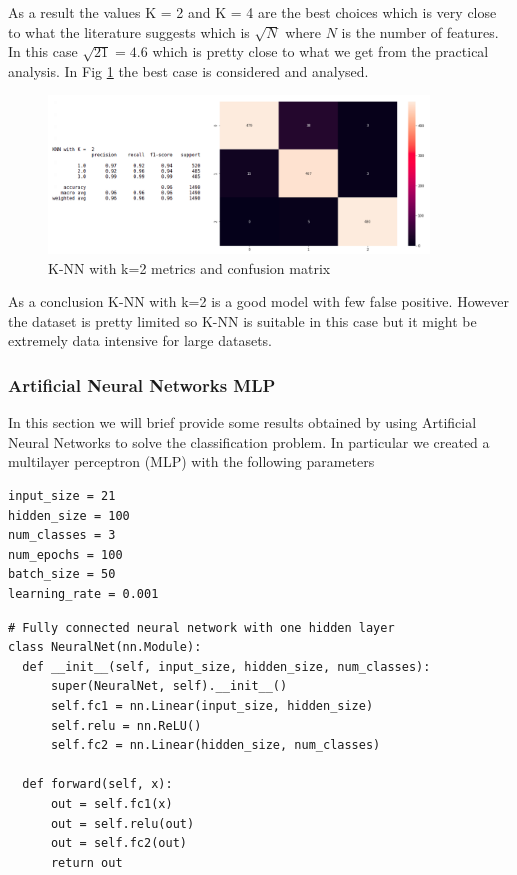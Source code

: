 \documentclass[a4paper,12pt]{article}
\begin{document}
\noindent As a result the values K = 2 and K = 4 are the best choices which is very close to what the literature suggests which is $\sqrt{N}$ where $N$ is the number of features. In this case $\sqrt{21} = 4.6$ which is pretty close to what we get from the practical analysis. In Fig \ref{fig:knn2} the best case is considered and analysed.

\begin{figure}[H]
  \begin{center}
  \includegraphics[width=0.9\textwidth]{images/knn2res.png}
  \end{center}
  \caption{K-NN with k=2 metrics and confusion matrix}
  \label{fig:knn2}
\end{figure}


\noindent As a conclusion K-NN with k=2 is a good model with few false positive. However the dataset is pretty limited so K-NN is suitable in this case but it might be extremely data intensive for large datasets.

\subsubsection{Artificial Neural Networks MLP}
In this section we will brief provide some results obtained by using Artificial Neural Networks to solve the classification problem. In particular we created a multilayer perceptron (MLP) with the following parameters
\begin{Verbatim}[fontsize=\small]
input_size = 21
hidden_size = 100
num_classes = 3
num_epochs = 100
batch_size = 50
learning_rate = 0.001
\end{Verbatim} 

\begin{Verbatim}[fontsize=\small]
# Fully connected neural network with one hidden layer
class NeuralNet(nn.Module):
  def __init__(self, input_size, hidden_size, num_classes):
      super(NeuralNet, self).__init__()
      self.fc1 = nn.Linear(input_size, hidden_size) 
      self.relu = nn.ReLU()
      self.fc2 = nn.Linear(hidden_size, num_classes)  
  
  def forward(self, x):
      out = self.fc1(x)
      out = self.relu(out)
      out = self.fc2(out)
      return out
\end{Verbatim}
\end{document}
